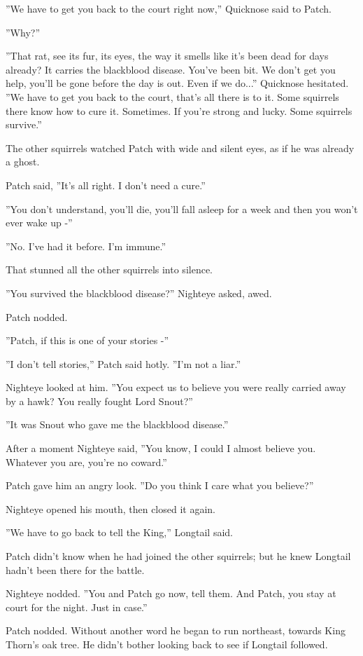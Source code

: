 \documentclass[12pt]{book}
\begin{document}
 ''We have to get you back to the court right now,'' Quicknose said to Patch.\par
 ''Why?''\par
 ''That rat, see its fur, its eyes, the way it smells like it's been dead for days already? It carries the blackblood disease. You've been bit. We don't get you help, you'll be gone before the day is out. Even if we do...'' Quicknose hesitated. ''We have to get you back to the court, that's all there is to it. Some squirrels there know how to cure it. Sometimes. If you're strong and lucky. Some squirrels survive.''\par
 The other squirrels watched Patch with wide and silent eyes, as if he was already a ghost.\par
 Patch said, ''It's all right. I don't need a cure.''\par
 ''You don't understand, you'll die, you'll fall asleep for a week and then you won't ever wake up -''\par
 ''No. I've had it before. I'm immune.''\par
 That stunned all the other squirrels into silence.\par
 ''You survived the blackblood disease?'' Nighteye asked, awed.\par
 Patch nodded.\par
 ''Patch, if this is one of your stories -''\par
 ''I don't tell stories,'' Patch said hotly. ''I'm not a liar.''\par
 Nighteye looked at him. ''You expect us to believe you were really carried away by a hawk? You really fought Lord Snout?''\par
 ''It was Snout who gave me the blackblood disease.''\par
 After a moment Nighteye said, ''You know, I could I almost believe you. Whatever you are, you're no coward.''\par
 Patch gave him an angry look. ''Do you think I care what you believe?''\par
 Nighteye opened his mouth, then closed it again.\par
 ''We have to go back to tell the King,'' Longtail said.\par
 Patch didn't know when he had joined the other squirrels; but he knew Longtail hadn't been there for the battle.\par
 Nighteye nodded. ''You and Patch go now, tell them. And Patch, you stay at court for the night. Just in case.''\par
 Patch nodded. Without another word he began to run northeast, towards King Thorn's oak tree. He didn't bother looking back to see if Longtail followed.\par
\end{document}
